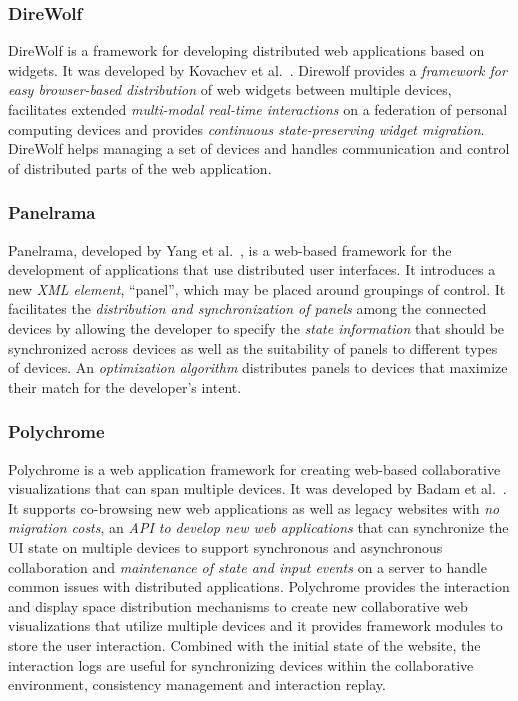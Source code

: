 \subsubsection{DireWolf}

DireWolf is a framework for developing distributed web applications based on widgets. It was developed by Kovachev et al.~\cite{direwolf2013}. Direwolf provides a \emph{framework for easy browser-based distribution} of web widgets between multiple devices, facilitates extended \emph{multi-modal real-time interactions} on a federation of personal computing devices and provides \emph{continuous state-preserving widget migration}. DireWolf helps managing a set of devices and handles communication and control of distributed parts of the web application. 

\subsubsection{Panelrama}

Panelrama, developed by Yang et al.~\cite{panelrama2014}, is a web-based framework for the development of applications that use distributed user interfaces. It introduces a new \emph{XML element}, ``panel'', which may be placed around groupings of control. It facilitates the \emph{distribution and synchronization of panels} among the connected devices by allowing the developer to specify the \emph{state information} that should be synchronized across devices as well as the suitability of panels to different types of devices. An \emph{optimization algorithm} distributes panels to devices that maximize their match for the developer's intent.

\subsubsection{Polychrome}

Polychrome is a web application framework for creating web-based collaborative visualizations that can span multiple devices. It was developed by Badam et al.~\cite{polychrome2014}. It supports co-browsing new web applications as well as legacy websites with \emph{no migration costs}, an \emph{API to develop new web applications} that can synchronize the UI state on multiple devices to support synchronous and asynchronous collaboration and \emph{maintenance of state and input events} on a server to handle common issues with distributed applications. Polychrome provides the interaction and display space distribution mechanisms to create new collaborative web visualizations that utilize multiple devices and it provides framework modules to store the user interaction. Combined with the initial state of the website, the interaction logs are useful for synchronizing devices within the collaborative environment, consistency management and interaction replay.

